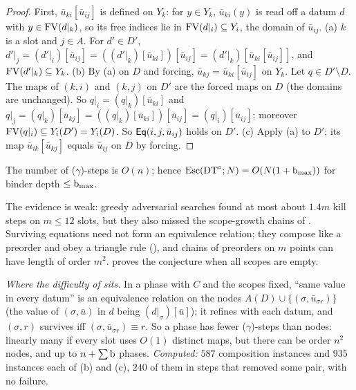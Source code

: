 \begin{proof}
First, $\bar u_{ki}[\bar u_{ij}]$ is defined on $Y_k$: for $y\in Y_k$, $\bar u_{ki}(y)$ is read off a datum $d$ with $y\in\mathrm{FV}(d|_k)$, so its free indices lie in $\mathrm{FV}(d|_i)\subseteq Y_i$, the domain of $\bar u_{ij}$. (a) $k$ is a slot and $j\in A$. For $d'\in D'$, $d'|_j=(d'|_i)[\bar u_{ij}]=((d'|_k)[\bar u_{ki}])[\bar u_{ij}]=(d'|_k)[\bar u_{ki}[\bar u_{ij}]]$, and $\mathrm{FV}(d'|_k)\subseteq Y_k$. (b) By (a) on $D$ and forcing, $\bar u_{kj}=\bar u_{ki}[\bar u_{ij}]$ on $Y_k$. Let $q\in D'\setminus D$. The maps of $(k,i)$ and $(k,j)$ on $D'$ are the forced maps on $D$ (the domains are unchanged). So $q|_i=(q|_k)[\bar u_{ki}]$ and $q|_j=(q|_k)[\bar u_{kj}]=((q|_k)[\bar u_{ki}])[\bar u_{ij}]=(q|_i)[\bar u_{ij}]$; moreover $\mathrm{FV}(q|_i)\subseteq Y_i(D')=Y_i(D)$. So $\mathsf{Eq}(i,j,\bar u_{ij})$ holds on $D'$. (c) Apply (a) to $D'$; its map $\bar u_{ik}[\bar u_{kj}]$ equals $\bar u_{ij}$ on $D$ by forcing.
\end{proof}

\begin{conjecture}\label{conj:single:kill}
The number of ($\gamma$)-steps is $O(n)$; hence $\mathrm{Esc}(\mathrm{DT}^{\circ};N)=O(N(1+\mathrm{b}_{\max}))$ for binder depth $\le\mathrm{b}_{\max}$.
\end{conjecture}

\noindent The evidence is weak: greedy adversarial searches found at most about $1.4m$ kill steps on $m\le12$ slots, but they also missed the scope-growth chains of . Surviving equations need not form an equivalence relation; they compose like a preorder and obey a triangle rule (), and chains of preorders on $m$ points can have length of order $m^2$.  proves the conjecture when all scopes are empty.

\emph{Where the difficulty of  sits.} In a phase with $C$ and the scopes fixed, ``same value in every datum'' is an equivalence relation on the nodes $A(D)\cup\{(\sigma,\bar u_{\sigma r})\}$ (the value of $(\sigma,\bar u)$ in $d$ being $(d|_\sigma)[\bar u]$); it refines with each datum, and $(\sigma,r)$ survives iff $(\sigma,\bar u_{\sigma r})\equiv r$. So a phase has fewer ($\gamma$)-steps than nodes: linearly many if every slot uses $O(1)$ distinct maps, but there can be order $n^2$ nodes, and up to $n+\sum\mathrm{b}$ phases. \emph{Computed:} $587$ composition instances and $935$ instances each of (b) and (c), $240$ of them in steps that removed some pair, with no failure.

